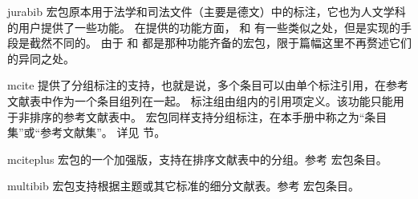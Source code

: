 \begin{marglist}
\item[jurabib]
 宏包原本用于法学和司法文件（主要是德文）中的标注，它也为人文学科的用户提供了一些功能。
在提供的功能方面， 和 \biblatex 有一些类似之处，但是实现的手段是截然不同的。
由于  和 \biblatex 都是那种功能齐备的宏包，限于篇幅这里不再赘述它们的异同之处。

\item[mcite]
 提供了分组标注的支持，也就是说，多个条目可以由单个标注引用，在参考文献表中作为一个条目组列在一起。
标注组由组内的引用项定义。该功能只能用于非排序的参考文献表中。
\biblatex 宏包同样支持分组标注，在本手册中称之为“条目集”或“参考文献集”。
详见  节。

\item[mciteplus]
 宏包的一个加强版，支持在排序文献表中的分组。参考  宏包条目。

\item[multibib]
 宏包支持根据主题或其它标准的细分文献表。参考  宏包条目。


\end{marglist}
